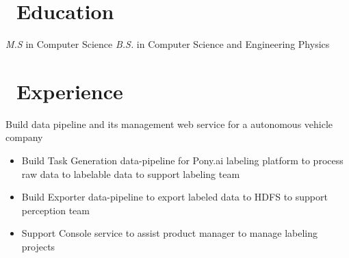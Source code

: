 \documentclass{resume}
\begin{document}



\section{\faGraduationCap\ Education}
\textit{M.S} in Computer Science
\textit{B.S.} in Computer Science and Engineering Physics

\section{\faUsers\ Experience}
Build data pipeline and its management web service for a autonomous vehicle company
\begin{itemize}
  \item Build Task Generation data-pipeline for Pony.ai labeling platform to process raw data to labelable data to support labeling team
  \item Build Exporter data-pipeline to export labeled data to HDFS to support perception team 
  \item Support Console service to assist product manager to manage labeling projects
\end{itemize}
\end{document}
